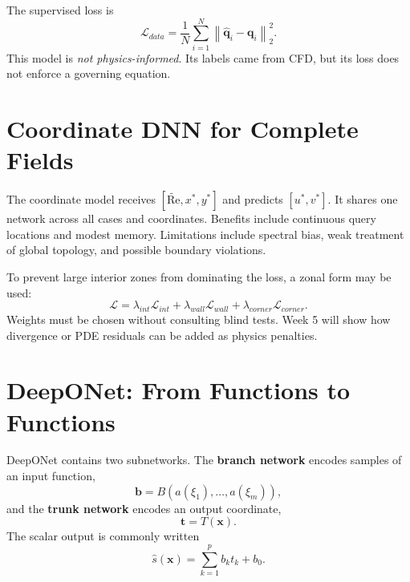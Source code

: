 \documentclass[11pt]{article}
\newcommand{\Rey}{\mathrm{Re}}
\newcommand{\vect}[1]{\bm{#1}}
\begin{document}
The supervised loss is
\begin{equation}
\mathcal{L}_{data}=\frac{1}{N}\sum_{i=1}^{N}\left\|\widehat{\vect{q}}_i-\vect{q}_i\right\|_2^2.
\end{equation}
This model is \emph{not physics-informed}. Its labels came from CFD, but its loss does not enforce a governing equation.

\section{Coordinate DNN for Complete Fields}
The coordinate model receives $[\widetilde{\Rey},x^*,y^*]$ and predicts $[u^*,v^*]$. It shares one network across all cases and coordinates. Benefits include continuous query locations and modest memory. Limitations include spectral bias, weak treatment of global topology, and possible boundary violations.

To prevent large interior zones from dominating the loss, a zonal form may be used:
\begin{equation}
\mathcal{L}=\lambda_{int}\mathcal{L}_{int}+\lambda_{wall}\mathcal{L}_{wall}+\lambda_{corner}\mathcal{L}_{corner}.
\end{equation}
Weights must be chosen without consulting blind tests. Week 5 will show how divergence or PDE residuals can be added as physics penalties.

\section{DeepONet: From Functions to Functions}
DeepONet contains two subnetworks. The \textbf{branch network} encodes samples of an input function,
\begin{equation}
\vect{b}=B\!\left(a(\xi_1),\ldots,a(\xi_m)\right),
\end{equation}
and the \textbf{trunk network} encodes an output coordinate,
\begin{equation}
\vect{t}=T(\vect{x}).
\end{equation}
The scalar output is commonly written
\begin{equation}
\widehat{s}(\vect{x})=\sum_{k=1}^{p}b_k t_k+b_0.
\end{equation}
\end{document}
